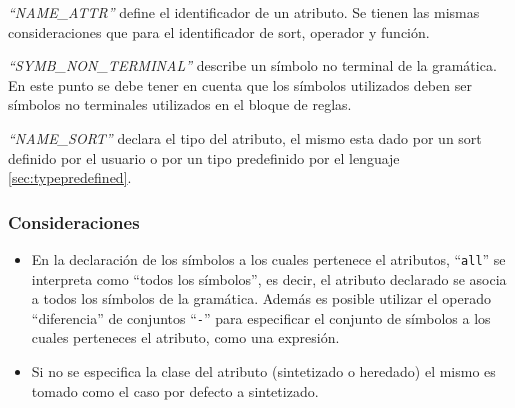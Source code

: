 \textit{``NAME\_ATTR''} define el identificador de un atributo. Se tienen las mismas consideraciones que para el identificador de sort, operador y función.

\textit{``SYMB\_NON\_TERMINAL''} describe un símbolo no terminal de la gramática. En este punto se debe tener en cuenta que los símbolos utilizados deben ser símbolos no terminales utilizados en el bloque de reglas.

\textit{``NAME\_SORT''} declara el tipo del atributo, el mismo esta dado por un sort definido por el usuario o por un tipo predefinido por el lenguaje \ref{sec:typepredefined}.

\subsubsection*{Consideraciones}

\begin{itemize}
\item En la declaración de los símbolos a los cuales pertenece el atributos, ``\texttt{all}'' se interpreta como ``todos los símbolos'', es decir, el atributo declarado se asocia a todos los símbolos de la gramática. Además es posible utilizar el operado ``diferencia'' de conjuntos ``\texttt{-}'' para especificar el conjunto de símbolos a los cuales perteneces el atributo, como una expresión.

\item Si no se especifica la clase del atributo (sintetizado o heredado) el mismo es tomado como el caso por defecto a sintetizado.
\end{itemize}


